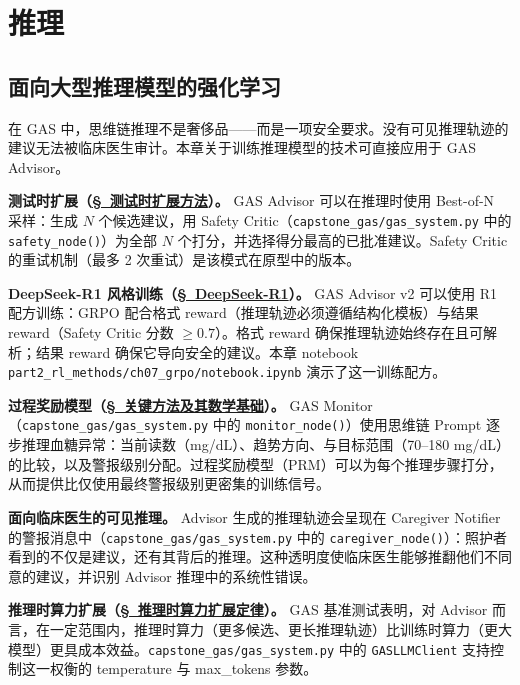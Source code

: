\part{推理}

\chapter{面向大型推理模型的强化学习}
\label{sec:rl_reasoning}

\begin{keybox}
在 GAS 中，思维链推理不是奢侈品——而是一项安全要求。没有可见推理轨迹的建议无法被临床医生审计。本章关于训练推理模型的技术可直接应用于 GAS Advisor。

\textbf{测试时扩展（\hyperref[sec:test_time_methods]{\S~测试时扩展方法}）。}
GAS Advisor 可以在推理时使用 Best-of-N 采样：生成 $N$ 个候选建议，用 Safety Critic（\texttt{capstone\_gas/gas\_system.py} 中的 \texttt{safety\_node()}）为全部 $N$ 个打分，并选择得分最高的已批准建议。Safety Critic 的重试机制（最多 2 次重试）是该模式在原型中的版本。

\textbf{DeepSeek-R1 风格训练（\hyperref[subsec:deepseek_r1]{\S~DeepSeek-R1}）。}
GAS Advisor v2 可以使用 R1 配方训练：GRPO 配合格式 reward（推理轨迹必须遵循结构化模板）与结果 reward（Safety Critic 分数 $\geq 0.7$）。格式 reward 确保推理轨迹始终存在且可解析；结果 reward 确保它导向安全的建议。本章 notebook \texttt{part2\_rl\_methods/ch07\_grpo/notebook.ipynb} 演示了这一训练配方。

\textbf{过程奖励模型（\hyperref[subsec:reasoning_methods]{\S~关键方法及其数学基础}）。}
GAS Monitor（\texttt{capstone\_gas/gas\_system.py} 中的 \texttt{monitor\_node()}）使用思维链 Prompt 逐步推理血糖异常：当前读数（mg/dL）、趋势方向、与目标范围（70--180 mg/dL）的比较，以及警报级别分配。过程奖励模型（PRM）可以为每个推理步骤打分，从而提供比仅使用最终警报级别更密集的训练信号。

\textbf{面向临床医生的可见推理。}
Advisor 生成的推理轨迹会呈现在 Caregiver Notifier 的警报消息中（\texttt{capstone\_gas/gas\_system.py} 中的 \texttt{caregiver\_node()}）：照护者看到的不仅是建议，还有其背后的推理。这种透明度使临床医生能够推翻他们不同意的建议，并识别 Advisor 推理中的系统性错误。

\textbf{推理时算力扩展（\hyperref[sec:inference-time-scaling]{\S~推理时算力扩展定律}）。}
GAS 基准测试表明，对 Advisor 而言，在一定范围内，推理时算力（更多候选、更长推理轨迹）比训练时算力（更大模型）更具成本效益。\texttt{capstone\_gas/gas\_system.py} 中的 \texttt{GASLLMClient} 支持控制这一权衡的 temperature 与 max\_tokens 参数。
\end{keybox}

